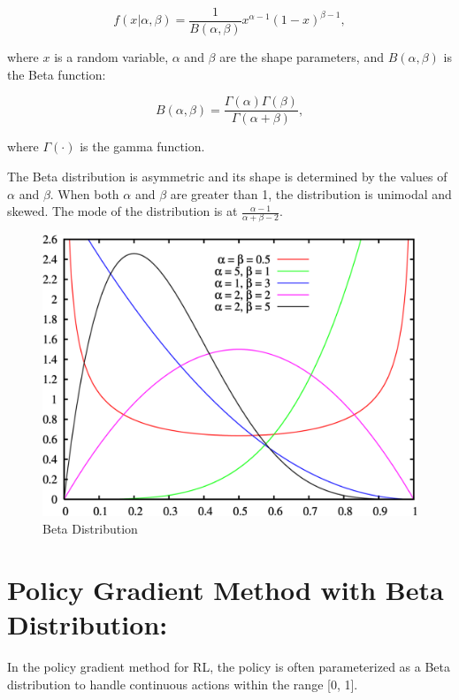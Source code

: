 \begin{equation}
    f(x | \alpha, \beta) = \frac{1}{B(\alpha, \beta)} x^{\alpha - 1}(1 - x)^{\beta - 1},\label{eq:equation4}
\end{equation}

where $x$ is a random variable, $\alpha$ and $\beta$ are the shape parameters, and $B(\alpha, \beta)$ is the Beta function:

\begin{equation}
    B(\alpha, \beta) = \frac{\Gamma(\alpha) \Gamma(\beta)}{\Gamma(\alpha + \beta)},\label{eq:equation3}
\end{equation}

where $\Gamma(\cdot)$ is the gamma function.

The Beta distribution is asymmetric and its shape is determined by the values of $\alpha$ and $\beta$. When both $\alpha$ and $\beta$ are greater than 1, the distribution is unimodal and skewed.
The mode of the distribution is at $\frac{\alpha - 1}{\alpha + \beta - 2}$.

\begin{figure}[h!]
    \centering
    \includegraphics[width=12cm]{assets/beta}
    \caption{Beta Distribution}\label{fig:figure2}
\end{figure}

\section{Policy Gradient Method with Beta Distribution:}\label{sec:policy-gradient-method-with-beta-distribution:}
In the policy gradient method for RL, the policy is often parameterized as a Beta distribution to handle continuous actions within the range [0, 1].


